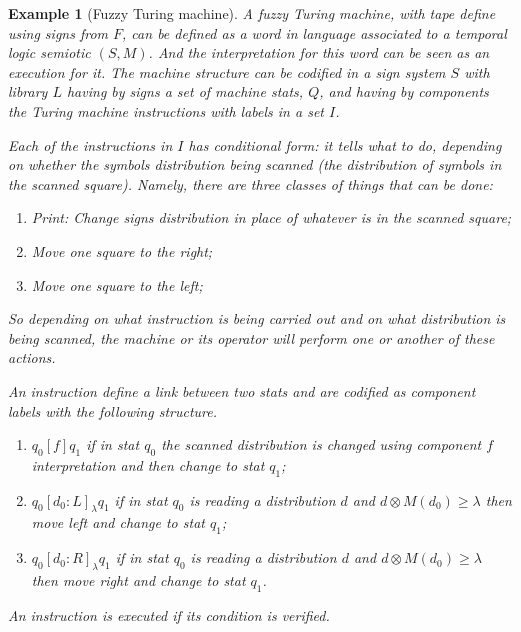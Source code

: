\documentclass[oribibl]{llncs}
\newtheorem{exam}{Example}
\begin{document}
\begin{exam}[Fuzzy Turing machine]
A fuzzy Turing machine, with tape define using signs from $F$, can be defined as a word in language associated to a temporal logic semiotic $(S,M)$. And the interpretation for this word can be seen as an execution for it.  The machine structure can be codified in a sign system $S$ with library $L$ having by signs a set of machine stats, $Q$, and having by components the Turing machine instructions with labels in a set $I$.

Each of the instructions in $I$ has conditional form: it tells what to do, depending on whether the symbols distribution being scanned (the distribution of symbols in the scanned square). Namely, there are three classes of things that can be done:
\begin{enumerate}
  \item Print: Change signs distribution in place of whatever is in the scanned square;
  \item Move one square to the right;
  \item Move one square to the left;
\end{enumerate}
So depending on what instruction is being carried out and on what distribution is being scanned, the machine or its operator will perform one or another of these actions.

An instruction define a link between two stats and are codified as component labels with the following structure.
\begin{enumerate}
  \item $q_0[f] q_1$ if in stat $q_0$ the scanned distribution is changed using component $f$ interpretation and then change to stat $q_1$;
  \item $q_0[d_0:L]_\lambda q_1$ if in stat $q_0$ is reading a distribution $d$ and  $d\otimes M(d_0)\geq\lambda$ then move left and change to stat $q_1$;
  \item $q_0[d_0:R]_\lambda q_1$ if in stat $q_0$ is reading a distribution $d$ and  $d\otimes M(d_0)\geq\lambda$ then move right and change to stat $q_1$.
\end{enumerate} An instruction is executed if its condition is verified.


\end{exam}
\end{document}
